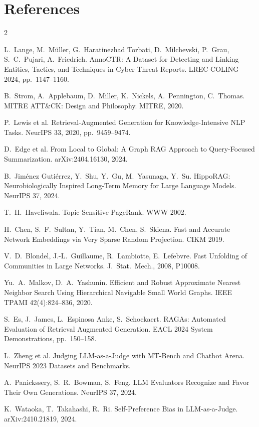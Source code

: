 \documentclass[10pt]{article}
\begin{document}
\section*{References}
\begin{multicols}{2}
{\footnotesize\begin{list}{}{\setlength{\leftmargin}{1.8em}\setlength{\labelwidth}{1.5em}\setlength{\labelsep}{0.3em}\setlength{\itemsep}{0pt}\setlength{\parsep}{0pt}\setlength{\topsep}{0pt}}
\item[{[1]}] L.\ Lange, M.\ Müller, G.\ Haratinezhad Torbati, D.\ Milchevski, P.\ Grau, S.\ C.\ Pujari, A.\ Friedrich. AnnoCTR: A Dataset for Detecting and Linking Entities, Tactics, and Techniques in Cyber Threat Reports. LREC-COLING 2024, pp.\ 1147--1160.
\item[{[2]}] B.\ Strom, A.\ Applebaum, D.\ Miller, K.\ Nickels, A.\ Pennington, C.\ Thomas. MITRE ATT\&CK: Design and Philosophy. MITRE, 2020.
\item[{[3]}] P.\ Lewis et al. Retrieval-Augmented Generation for Knowledge-Intensive NLP Tasks. NeurIPS 33, 2020, pp.\ 9459--9474.
\item[{[4]}] D.\ Edge et al. From Local to Global: A Graph RAG Approach to Query-Focused Summarization. arXiv:2404.16130, 2024.
\item[{[5]}] B.\ Jiménez Gutiérrez, Y.\ Shu, Y.\ Gu, M.\ Yasunaga, Y.\ Su. HippoRAG: Neurobiologically Inspired Long-Term Memory for Large Language Models. NeurIPS 37, 2024.
\item[{[6]}] T.\ H.\ Haveliwala. Topic-Sensitive PageRank. WWW 2002.
\item[{[7]}] H.\ Chen, S.\ F.\ Sultan, Y.\ Tian, M.\ Chen, S.\ Skiena. Fast and Accurate Network Embeddings via Very Sparse Random Projection. CIKM 2019.
\item[{[8]}] V.\ D.\ Blondel, J.-L.\ Guillaume, R.\ Lambiotte, E.\ Lefebvre. Fast Unfolding of Communities in Large Networks. J.\ Stat.\ Mech., 2008, P10008.
\item[{[9]}] Yu.\ A.\ Malkov, D.\ A.\ Yashunin. Efficient and Robust Approximate Nearest Neighbor Search Using Hierarchical Navigable Small World Graphs. IEEE TPAMI 42(4):824--836, 2020.
\item[{[10]}] S.\ Es, J.\ James, L.\ Espinosa Anke, S.\ Schockaert. RAGAs: Automated Evaluation of Retrieval Augmented Generation. EACL 2024 System Demonstrations, pp.\ 150--158.
\item[{[11]}] L.\ Zheng et al. Judging LLM-as-a-Judge with MT-Bench and Chatbot Arena. NeurIPS 2023 Datasets and Benchmarks.
\item[{[12]}] A.\ Panickssery, S.\ R.\ Bowman, S.\ Feng. LLM Evaluators Recognize and Favor Their Own Generations. NeurIPS 37, 2024.
\item[{[13]}] K.\ Wataoka, T.\ Takahashi, R.\ Ri. Self-Preference Bias in LLM-as-a-Judge. arXiv:2410.21819, 2024.
\end{list}}
\end{multicols}
\end{document}
